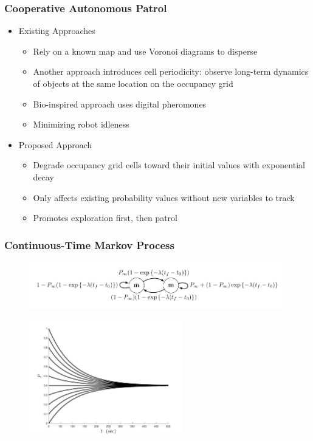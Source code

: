 \documentclass[11pt,professionalfonts,hyperref={pdftex,pdfpagemode=none,pdfstartview=FitH}]{beamer}
\begin{document}
\begin{frame}
\frametitle{Cooperative Autonomous Patrol}

\begin{itemize}
	\item Existing Approaches
	\begin{itemize}
		\item Rely on a known map and use Voronoi diagrams to disperse
		\item Another approach introduces cell periodicity: observe long-term dynamics of objects at the same location on the occupancy grid
		\item Bio-inspired approach uses digital pheromones 
		\item Minimizing robot idleness
	\end{itemize}
	\item Proposed Approach
	\begin{itemize}
		\item Degrade occupancy grid cells toward their initial values with exponential decay
		\item Only affects existing probability values without new variables to track
		\item Promotes exploration first, then patrol
	\end{itemize}
\end{itemize}

\end{frame}

\begin{frame}
\frametitle{Continuous-Time Markov Process}

\begin{figure}
\centering
\includegraphics[width=\textwidth]{markov_diagram_continuous.pdf}
\end{figure}

\begin{figure}
\centering
\includegraphics[width=0.6\textwidth]{DegradeExamples.pdf}
\end{figure}

\end{frame}
\end{document}
